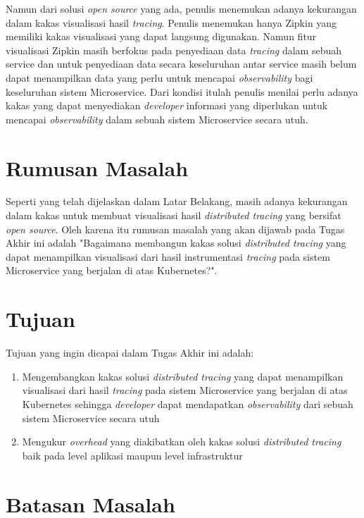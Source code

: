 Namun dari solusi \textit{open source} yang ada, penulis menemukan adanya kekurangan dalam kakas visualisasi hasil \textit{tracing}. Penulis menemukan hanya Zipkin yang memiliki kakas visualisasi yang dapat langsung digunakan. Namun fitur visualisasi Zipkin masih berfokus pada penyediaan data \textit{tracing} dalam sebuah service dan untuk penyediaan data secara keseluruhan antar service masih belum dapat menampilkan data yang perlu untuk mencapai \textit{observability} bagi keseluruhan sistem Microservice. Dari kondisi itulah penulis menilai perlu adanya kakas yang dapat menyediakan \textit{developer} informasi yang diperlukan untuk mencapai \textit{observability} dalam sebuah sistem Microservice secara utuh. 


\section{Rumusan Masalah}\label{RumusanMasalah}

Seperti yang telah dijelaskan dalam Latar Belakang, masih adanya kekurangan dalam kakas untuk membuat visualisasi hasil \textit{distributed tracing} yang bersifat \textit{open source}. Oleh karena itu rumusan masalah yang akan dijawab pada Tugas Akhir ini adalah "Bagaimana membangun kakas solusi \textit{distributed tracing} yang dapat menampilkan visualisasi dari hasil instrumentasi \textit{tracing} pada sistem Microservice yang berjalan di atas Kubernetes?".

\section{Tujuan}

Tujuan yang ingin dicapai dalam Tugas Akhir ini adalah:
\begin{enumerate}
	\item Mengembangkan kakas solusi \textit{distributed tracing}  yang dapat menampilkan visualisasi dari hasil \textit{tracing} pada sistem Microservice yang berjalan di atas Kubernetes sehingga \textit{developer} dapat mendapatkan \textit{observability} dari sebuah sistem Microservice secara utuh
	\item Mengukur \textit{overhead} yang diakibatkan oleh kakas solusi \textit{distributed tracing} baik pada level aplikasi maupun level infrastruktur
\end{enumerate}


\section{Batasan Masalah}

